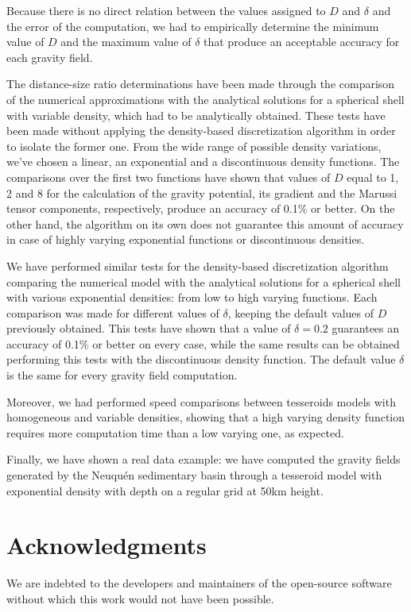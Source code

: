 \documentclass[extra]{gji}
\begin{document}
Because there is no direct relation between the values assigned to $D$ and $\delta$ and the error of the computation, we had to empirically determine the minimum value of $D$ and the maximum value of $\delta$ that produce an acceptable accuracy for each gravity field.

The distance-size ratio determinations have been made through the comparison of the numerical approximations with the analytical solutions for a spherical shell with variable density, which had to be analytically obtained.
These tests have been made without applying the density-based discretization algorithm in order to isolate the former one.
From the wide range of possible density variations, we've chosen a linear, an exponential and a discontinuous density functions.
The comparisons over the first two functions have shown that values of $D$ equal to 1, 2 and 8 for the calculation of the gravity potential, its gradient and the Marussi tensor components, respectively, produce an accuracy of 0.1\% or better.
On the other hand, the algorithm on its own does not guarantee this amount of accuracy in case of highly varying exponential functions or discontinuous densities.

We have performed similar tests for the density-based discretization algorithm comparing the numerical model with the analytical solutions for a spherical shell with various exponential densities: from low to high varying functions.
Each comparison was made for different values of $\delta$, keeping the default values of $D$ previously obtained.
This tests have shown that a value of $\delta = 0.2$ guarantees an accuracy of 0.1\% or better on every case, while the same results can be obtained performing this tests with the discontinuous density function.
The default value $\delta$ is the same for every gravity field computation.

Moreover, we had performed speed comparisons between tesseroids models with homogeneous and variable densities, showing that a high varying density function requires more computation time than a low varying one, as expected.

Finally, we have shown a real data example: we have computed the gravity fields generated by the Neuqu\'en sedimentary basin through a tesseroid model with exponential density with depth on a regular grid at 50km height.



\section{Acknowledgments}

We are indebted to the developers and maintainers of the open-source
software without which this work would not have been possible.




\end{document}

